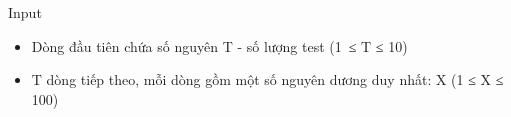 Input  
\begin{itemize}
	\item     Dòng đầu tiên chứa số nguyên T - số lượng test (1 ≤ T ≤ 10)   
	\item     T dòng tiếp theo, mỗi dòng gồm một số nguyên dương duy nhất: X (1 ≤ X ≤ 100)   
\end{itemize}